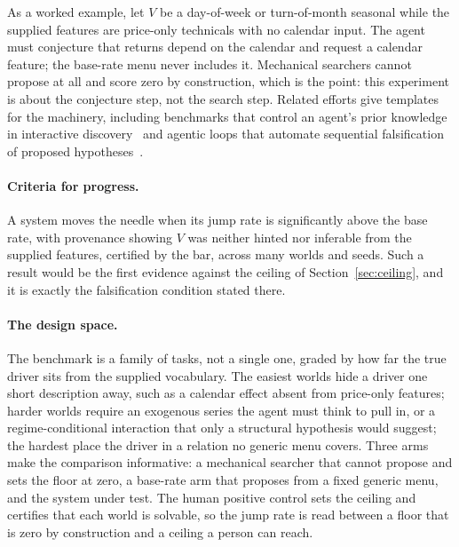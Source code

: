 \documentclass[11pt]{article}
\begin{document}
As a worked example, let $V$ be a day-of-week or turn-of-month seasonal while the supplied features are
price-only technicals with no calendar input. The agent must conjecture that returns depend on the
calendar and request a calendar feature; the base-rate menu never includes it. Mechanical searchers
cannot propose at all and score zero by construction, which is the point: this experiment is about the
conjecture step, not the search step. Related efforts give templates for the machinery, including
benchmarks that control an agent's prior knowledge in interactive discovery~\cite{physgym} and agentic
loops that automate sequential falsification of proposed hypotheses~\cite{falsify}.

\paragraph{Criteria for progress.} A system moves the needle when its jump rate is
significantly above the base rate, with provenance showing $V$ was neither hinted nor inferable from
the supplied features, certified by the bar, across many worlds and seeds. Such a result would be the
first evidence against the ceiling of Section~\ref{sec:ceiling}, and it is exactly the falsification
condition stated there.

\paragraph{The design space.} The benchmark is a family of tasks, not a single one, graded by how far
the true driver sits from the supplied vocabulary. The easiest worlds hide a driver one short
description away, such as a calendar effect absent from price-only features; harder worlds require an
exogenous series the agent must think to pull in, or a regime-conditional interaction that only a
structural hypothesis would suggest; the hardest place the driver in a relation no generic menu covers.
Three arms make the comparison informative: a mechanical searcher that cannot propose and sets the
floor at zero, a base-rate arm that proposes from a fixed generic menu, and the system under test. The
human positive control sets the ceiling and certifies that each world is solvable, so the jump rate is
read between a floor that is zero by construction and a ceiling a person can reach.
\end{document}
